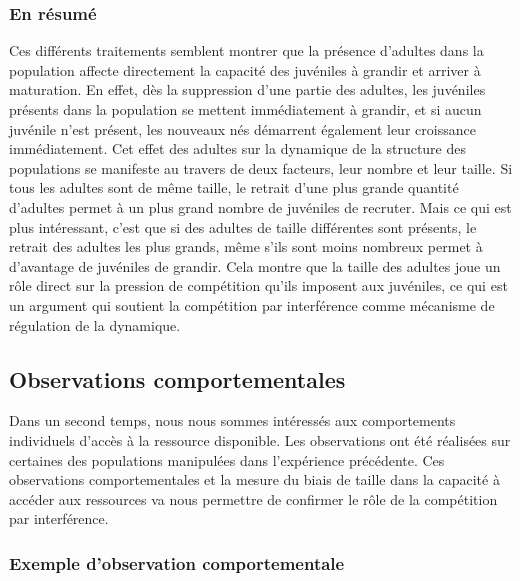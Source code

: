 \subsubsection{En résumé}

Ces différents traitements semblent montrer que la présence d'adultes dans la
population affecte directement la capacité des juvéniles à grandir et arriver
à maturation. En effet, dès la suppression d'une partie des adultes, les
juvéniles présents dans la population se mettent immédiatement à grandir, et si
aucun juvénile n'est présent, les nouveaux nés démarrent également leur
croissance immédiatement. Cet effet des adultes sur la dynamique de la structure
des populations se manifeste au travers de deux facteurs, leur nombre et leur
taille. Si tous les adultes sont de même taille, le retrait d'une plus grande
quantité d'adultes permet à un plus grand nombre de juvéniles de recruter. Mais
ce qui est plus intéressant, c'est que si des adultes de taille différentes sont
présents, le retrait des adultes les plus grands, même s'ils sont moins nombreux
permet à d'avantage de juvéniles de grandir. Cela montre que la taille des
adultes joue un rôle direct sur la pression de compétition qu'ils imposent aux
juvéniles, ce qui est un argument qui soutient la compétition par
interférence comme mécanisme de régulation de la dynamique. 

\subsection{Observations comportementales}

Dans un second temps, nous nous sommes intéressés aux comportements
individuels d'accès à la ressource disponible. Les observations ont été
réalisées sur certaines des populations manipulées dans l'expérience précédente.
Ces observations comportementales et la mesure du biais de taille dans la capacité à accéder aux
ressources va nous permettre de confirmer le rôle de la compétition par
interférence.

\subsubsection{Exemple d'observation comportementale}

